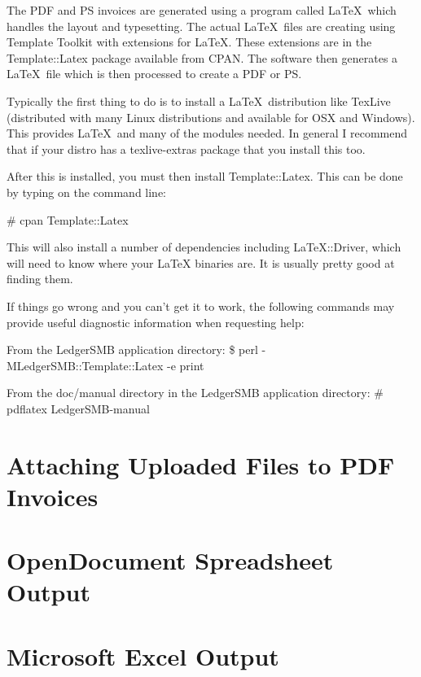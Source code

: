 The PDF and PS invoices are generated using a program called \LaTeX\
which handles the layout and typesetting.  The actual \LaTeX\ files are
creating using Template Toolkit with extensions for \LaTeX.  These
extensions are in the Template::Latex package available from CPAN.
The software then generates a \LaTeX\ file which is then processed to
create a PDF or PS.

Typically the first thing to do is to install a \LaTeX\ distribution
like TexLive (distributed with many Linux distributions and available
for OSX and Windows).  This provides \LaTeX\ and many of the modules
needed.   In general I recommend that if your distro has a
texlive-extras package that you install this too.

After this is installed, you must then install Template::Latex.  This
can be done by typing on the command line:

\# cpan Template::Latex

This will also install a number of dependencies including
LaTeX::Driver, which will need to know where your LaTeX binaries are.
It is usually pretty good at finding them.

If things go wrong and you can't get it to work, the following
commands may provide useful diagnostic information when requesting
help:

From the LedgerSMB application directory:
\$ perl -MLedgerSMB::Template::Latex -e print

From the doc/manual directory in the LedgerSMB application directory:
\# pdflatex LedgerSMB-manual

\section{Attaching Uploaded Files to PDF Invoices}

\section{OpenDocument Spreadsheet Output}

\section{Microsoft Excel Output}


